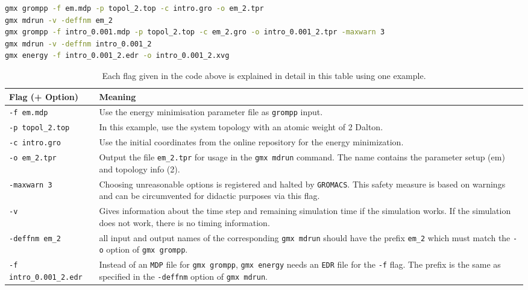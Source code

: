 \documentclass[9pt,tutorial]{livecoms}
\newcommand{\code}[1]{\colorbox{light-gray}{\texttt{#1}}}
\begin{document}
\begin{lstlisting}[language=bash]
gmx grompp -f em.mdp -p topol_2.top -c intro.gro -o em_2.tpr
gmx mdrun -v -deffnm em_2
gmx grompp -f intro_0.001.mdp -p topol_2.top -c em_2.gro -o intro_0.001_2.tpr -maxwarn 3
gmx mdrun -v -deffnm intro_0.001_2
gmx energy -f intro_0.001_2.edr -o intro_0.001_2.xvg
\end{lstlisting}
\begin{table}[H]
    \centering
    \caption{Each flag given in the code above is explained in detail in this table using one example.}
    \label{tab:flagsoptions}
    \footnotesize
    \begin{tabular}{l p{5cm}}
        \toprule
        Flag (+ Option) & Meaning \\
        \midrule
        \code{-f em.mdp}        & Use the energy minimisation parameter file as \code{grompp} input.\\ \midrule
        \code{-p topol\_2.top}  & In this example, use the system topology with an atomic weight of 2 Dalton.\\ \midrule
        \code{-c intro.gro}     & Use the initial coordinates from the online repository for the energy minimization.\\ \midrule
        \code{-o em\_2.tpr}     & Output the file \code{em\_2.tpr} for usage in the \code{gmx mdrun} command. The name contains the parameter setup (em) and topology info (2). \\ \midrule
        \code{-maxwarn 3}       & Choosing unreasonable options is registered and halted by \texttt{GROMACS}. This safety measure is based on warnings and can be circumvented for didactic purposes via this flag.\\ \midrule
        \code{-v}               & Gives information about the time step and remaining simulation time if the simulation works. If the simulation does not work, there is no timing information.\\ \midrule
        \code{-deffnm em\_2}            & all input and output names of the corresponding \code{gmx mdrun} should have the prefix \code{em\_2} which must match the \code{-o} option of \code{gmx grompp}.\\ \midrule
        \code{-f intro\_0.001\_2.edr}   & Instead of an \texttt{MDP} file for \code{gmx grompp}, \code{gmx energy} needs an \texttt{EDR} file for the \code{-f} flag. The prefix is the same as specified in the \code{-deffnm} option of \code{gmx mdrun}.\\
        \bottomrule
    \end{tabular}
\end{table}
\end{document}
